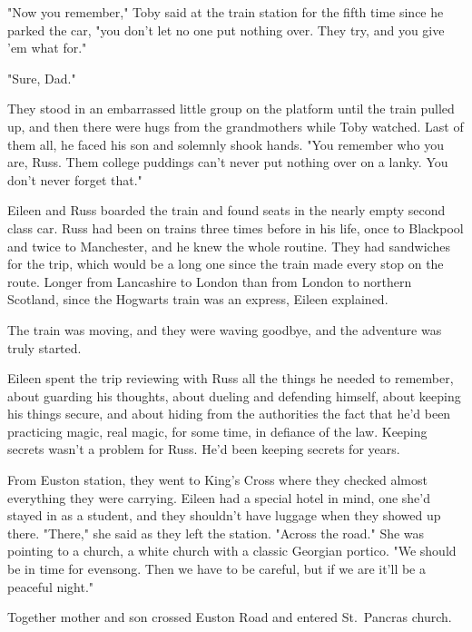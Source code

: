 "Now you remember," Toby said at the train station for the fifth time since he parked the car, "you don't let no one put nothing over. They try, and you give 'em what for."

"Sure, Dad."

They stood in an embarrassed little group on the platform until the train pulled up, and then there were hugs from the grandmothers while Toby watched. Last of them all, he faced his son and solemnly shook hands. "You remember who you are, Russ. Them college puddings can't never put nothing over on a lanky. You don't never forget that."

Eileen and Russ boarded the train and found seats in the nearly empty second class car. Russ had been on trains three times before in his life, once to Blackpool and twice to Manchester, and he knew the whole routine. They had sandwiches for the trip, which would be a long one since the train made every stop on the route. Longer from Lancashire to London than from London to northern Scotland, since the Hogwarts train was an express, Eileen explained.

The train was moving, and they were waving goodbye, and the adventure was truly started.

Eileen spent the trip reviewing with Russ all the things he needed to remember, about guarding his thoughts, about dueling and defending himself, about keeping his things secure, and about hiding from the authorities the fact that he'd been practicing magic, real magic, for some time, in defiance of the law. Keeping secrets wasn't a problem for Russ. He'd been keeping secrets for years.

From Euston station, they went to King's Cross where they checked almost everything they were carrying. Eileen had a special hotel in mind, one she'd stayed in as a student, and they shouldn't have luggage when they showed up there. "There," she said as they left the station. "Across the road." She was pointing to a church, a white church with a classic Georgian portico. "We should be in time for evensong. Then we have to be careful, but if we are it'll be a peaceful night."

Together mother and son crossed Euston Road and entered St.~Pancras church.
